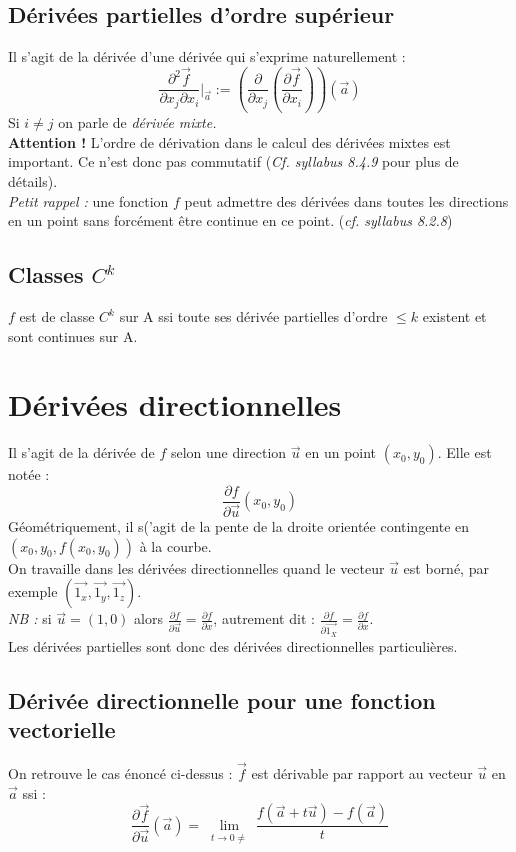 \documentclass	[11pt, a4paper, openany]{book}
\begin{document}
\subsection{Dérivées partielles d'ordre supérieur}
Il s'agit de la dérivée d'une dérivée qui s'exprime naturellement :
$$\frac{\partial^2\vec{f}}{\partial x_j \partial x_i}|_{\vec{a}} := \left(\frac{\partial}{\partial x_j}(\frac{\partial \vec{f}}{\partial x_i}) \right)(\vec{a})$$
Si $i \neq j$ on parle de \textit{dérivée mixte.}\\

\textbf{Attention !} L'ordre de dérivation dans le calcul des dérivées mixtes est important. Ce n'est donc pas commutatif (\textit{Cf. syllabus 8.4.9} pour plus de détails).\\
\textit{Petit rappel :} une fonction $f$ peut admettre des dérivées dans toutes les directions en un point sans forcément être continue en ce point. (\textit{cf. syllabus 8.2.8})

\subsection{Classes $C^k$}
$f$ est de classe $C^k$ sur A ssi toute ses dérivée partielles d'ordre $\leq k$ existent et sont continues sur A.

\section{Dérivées directionnelles}
Il s'agit de la dérivée de $f$ selon une direction $\vec{u}$ en un point $(x_0, y_0)$. Elle est notée :
$$\frac{\partial f}{\partial \vec{u}}(x_0, y_0)$$
Géométriquement, il s('agit de la pente de la droite orientée contingente en $(x_0, y_0, f(x_0, y_0))$ à la courbe.\\
On travaille dans les dérivées directionnelles quand le vecteur $\vec{u}$ est borné, par exemple $(\vec{1_x}, \vec{1_y}, \vec{1_z})$. \\

\textit{NB :} si $\vec{u} = (1,0)$ alors $\frac{\partial f}{\partial \vec{u}} = \frac{\partial f}{\partial x}$, autrement dit : $\frac{\partial f}{\partial\vec{1_X}} = \frac{\partial f}{\partial x}$.\\
Les dérivées partielles sont donc des dérivées directionnelles particulières.

\subsection{Dérivée directionnelle pour une fonction vectorielle}
On retrouve le cas énoncé ci-dessus : $\vec{f}$ est dérivable par rapport au vecteur $\vec{u}$ en $\vec{a}$ ssi : 
$$\frac{\partial\vec{f}}{\partial \vec{u}}(\vec{a}) = \lim\limits_{\substack{t \to 0 \neq}} \frac{f(\vec{a} + t\vec{u}) - f(\vec{a})}{t}$$
\end{document}
